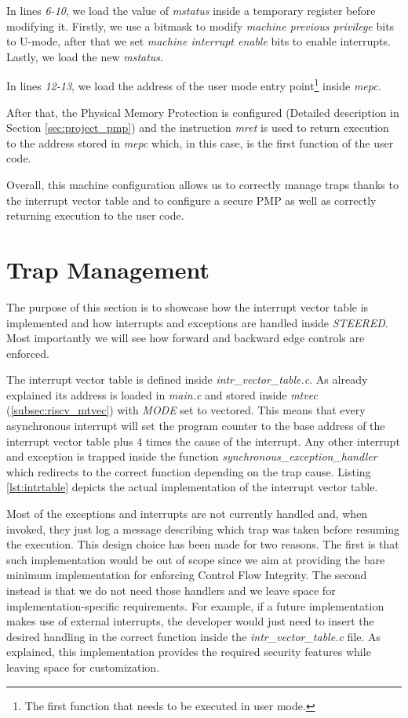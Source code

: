 In lines \textit{6-10}, we load the value of \textit{mstatus} inside a temporary
register before modifying it. Firstly, we use a bitmask to modify \textit{machine
previous privilege} bits to U-mode, after that we set \textit{machine interrupt
enable} bits to enable interrupts. Lastly, we load the new \textit{mstatus}.

In lines \textit{12-13}, we load the address of the user mode entry point\footnote{The
first function that needs to be executed in user mode.} inside \textit{mepc}.

After that, the Physical Memory Protection is configured (Detailed description in
Section \ref{sec:project_pmp}) and the instruction \textit{mret} is used to return
execution to the address stored in \textit{mepc} which, in this case, is the
first function of the user code.

Overall, this machine configuration allows us to correctly manage traps thanks to
the interrupt vector table and to configure a secure PMP as well as correctly returning
execution to the user code.

\section{Trap Management}
\label{sec:project_isr}

The purpose of this section is to showcase how the interrupt vector table is
implemented and how interrupts and exceptions are handled inside \textit{STEERED}.
Most importantly we will see how forward and backward edge controls are enforced.

The interrupt vector table is defined inside \textit{intr\_vector\_table.c}. As
already explained its address is loaded in \textit{main.c} and stored inside \textit{mtvec}
(\ref{subsec:riscv_mtvec}) with \textit{MODE} set to vectored. This means that
every asynchronous interrupt will set the program counter to the base address of
the interrupt vector table plus $4$ times the cause of the interrupt. Any other interrupt
and exception is trapped inside the function \textit{synchronous\_exception\_handler}
which redirects to the correct function depending on the trap cause. Listing \ref{lst:intrtable}
depicts the actual implementation of the interrupt vector table.

Most of the exceptions and interrupts are not currently handled and, when
invoked, they just log a message describing which trap was taken before resuming
the execution. This design choice has been made for two reasons. The first is that
such implementation would be out of scope since we aim at providing the bare minimum
implementation for enforcing Control Flow Integrity. The second instead is that
we do not need those handlers and we leave space for implementation-specific
requirements. For example, if a future implementation makes use of external
interrupts, the developer would just need to insert the desired handling in the correct
function inside the \textit{intr\_vector\_table.c} file. As explained, this
implementation provides the required security features while leaving space for
customization.

